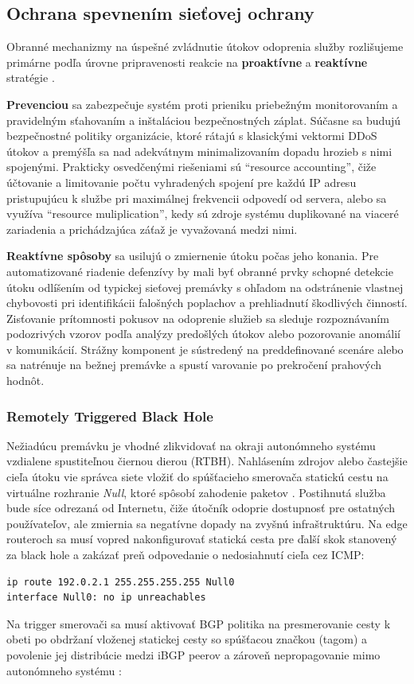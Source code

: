 \documentclass[12pt, a4paper]{article}
\begin{document}
\subsection{Ochrana spevnením sieťovej ochrany}
Obranné mechanizmy na úspešné zvládnutie útokov odoprenia služby rozlišujeme primárne podľa
úrovne pripravenosti reakcie na \textbf{proaktívne} a \textbf{reaktívne} stratégie
\cite{ddos-anatomy-2004}.

\textbf{Prevenciou} sa zabezpečuje systém proti prieniku priebežným monitorovaním
a pravidelným sťahovaním a inštaláciou bezpečnostných záplat. Súčasne sa budujú
bezpečnostné politiky organizácie, ktoré rátajú s klasickými vektormi DDoS útokov a premýšľa sa 
nad adekvátnym minimalizovaním dopadu hrozieb s nimi spojenými. Prakticky osvedčenými 
riešeniami sú \enquote{resource accounting}, čiže účtovanie a limitovanie počtu vyhradených spojení 
pre každú IP adresu pristupujúcu k službe pri maximálnej frekvencii odpovedí od servera, alebo sa využíva 
\enquote{resource muliplication}, kedy sú zdroje systému duplikované na viaceré zariadenia a prichádzajúca 
záťaž je vyvažovaná medzi nimi.

\textbf{Reaktívne spôsoby} sa usilujú o zmiernenie útoku počas jeho konania. Pre automatizované
riadenie defenzívy by mali byť obranné prvky schopné detekcie útoku odlíšením od typickej sieťovej 
premávky s ohľadom na odstránenie vlastnej chybovosti pri identifikácii falošných poplachov
a prehliadnutí škodlivých činností. Zisťovanie prítomnosti pokusov na odoprenie služieb
sa sleduje rozpoznávaním podozrivých vzorov podľa analýzy predošlých útokov alebo
pozorovanie anomálií v komunikácií. Strážny komponent je sústredený na preddefinované scenáre alebo
sa natrénuje na bežnej premávke a spustí varovanie po prekročení prahových hodnôt.

\subsubsection{Remotely Triggered Black Hole} 
Nežiadúcu premávku je vhodné zlikvidovať na okraji autonómneho systému vzdialene spustiteľnou čiernou dierou 
(RTBH). Nahlásením zdrojov alebo  častejšie cieľa útoku vie správca siete vložiť do spúšťacieho smerovača 
statickú cestu na virtuálne rozhranie \emph{Null}, ktoré spôsobí zahodenie paketov \cite{RFC5635}. 
Postihnutá služba bude síce odrezaná od Internetu, čiže útočník odoprie dostupnosť pre ostatných 
používateľov, ale zmiernia sa negatívne dopady na zvyšnú infraštruktúru. Na edge routeroch sa musí vopred 
nakonfigurovať statická cesta pre ďalší skok stanovený za black hole a zakázať preň odpovedanie o 
nedosiahnutí cieľa cez ICMP:
\begin{lstlisting}
ip route 192.0.2.1 255.255.255.255 Null0
interface Null0: no ip unreachables
\end{lstlisting}
Na trigger smerovači sa musí aktivovať BGP politika na presmerovanie cesty k obeti 
po obdržaní vloženej statickej cesty so spúšťacou značkou (tagom) a povolenie jej distribúcie
medzi iBGP peerov a zároveň nepropagovanie mimo autonómneho systému \cite{cisco-rtbh}:
\end{document}
